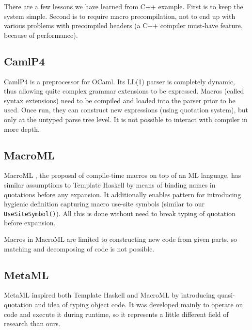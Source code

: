 \documentclass{llncs}
\begin{document}
There are a few lessons we have learned from C++ example. First is to
keep the system simple. Second is to require macro precompilation,
not to end up with various problems with precompiled headers (a C++
compiler must-have feature, because of performance).

\subsection{CamlP4}
CamlP4 is a preprocessor for OCaml.  Its LL(1) parser is completely
dynamic, thus allowing quite complex grammar extensions to be expressed.
Macros (called syntax extensions) need to be compiled and loaded into
the parser prior to be used. Once run, they can construct new expressions
(using quotation system), but only at the untyped parse tree level.
It is not possible to interact with compiler in more depth.


\subsection{MacroML}
MacroML \cite{MacroML}, the proposal of compile-time macros on top of an ML language, 
has similar assumptions to Template Haskell by means of binding names in quotations before 
any expansion. It additionally enables pattern for introducing hygienic definition capturing
macro use-site symbols (similar to our \verb,UseSiteSymbol(),). All this is done
without need to break typing of quotation before expansion.

Macros in MacroML are limited to constructing new code from given parts, so matching
and decomposing of code is not possible.

\subsection{MetaML}
MetaML \cite{MetaML} inspired both Template Haskell and MacroML by introducing 
quasi-quotation and idea of typing object code. It was developed mainly to operate 
on code and execute it during runtime, so it represents a little different field of 
research than ours.
\end{document}

